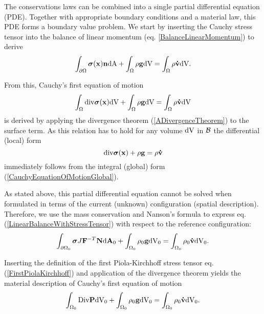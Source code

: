 The conservations laws can be combined into a single partial differential equation (PDE). Together with appropriate boundary conditions and a material law, this PDE forms a boundary value problem. We start by inserting the Cauchy stress tensor into the balance of linear momentum (eq. \ref{BalanceLinearMomentum}) to derive
 \begin{equation}
\int_{\partial \Omega}  \boldsymbol{\sigma} (\mathbf {x} )  \mathbf {n}   \textnormal{dA} + \int_{\Omega}   \rho \mathbf {g}   \textnormal{dV}  = \int _{\Omega} \rho \mathbf {\dot v}   \textnormal{dV}. 
\label{LinearBalanceWithStressTensor}
\end{equation}

From this, Cauchy's first equation of motion 
 \begin{equation}
\int_{ \Omega}   \textnormal{div} \boldsymbol{\sigma} (\mathbf {x} )   \textnormal{dV}  + \int_{\Omega}   \rho \mathbf {g}   \textnormal{dV}  = \int _{\Omega} \rho \mathbf {\dot v}   \textnormal{dV} 
\label{CauchyEquationOfMotionGlobal}
\end{equation}
is derived by applying the divergence theorem (\ref{ADivergenceTheorem}) to the surface term. As this relation has to hold for any volume $ \textnormal{dV}$ in $\mathcal{B} $ the differential (local) form
 \begin{equation}
  \textnormal{div} \boldsymbol{\sigma} (\mathbf {x} )    +    \rho \mathbf {g}    =  \rho \mathbf {\dot v}  
\label{CauchyEquationOfMotionLocal}
\end{equation}
immediately follows from the integral (global) form (\ref{CauchyEquationOfMotionGlobal}).

As stated above, this partial differential equation cannot be solved when formulated in terms of the current (unknown) configuration (spatial description). Therefore, we use the mass conservation and Nanson's formula to express eq. (\ref{LinearBalanceWithStressTensor}) with respect to the reference configuration: 
 \begin{equation}
\int_{\partial \Omega_0}  \boldsymbol{\sigma} J \mathbf {F }^{-T} \mathbf {N}   \textnormal{d}\mathbf{A}_0 + \int_{\Omega _0}   \rho _0 \mathbf {g}   \textnormal{dV}_0  = \int _{\Omega_0} \rho _0 \mathbf {\dot v}   \textnormal{dV}_0. 
\label{LinearBalanceWithStressTensorMaterial}
\end{equation}

Inserting the definition of the first Piola-Kirchhoff stress tensor eq. (\ref{FirstPiolaKirchhoff}) and application of the divergence theorem yields the material description of Cauchy's first equation of motion 
 \begin{equation}
\int_{\Omega_0}   \textnormal{Div}  \mathbf {P}    \textnormal{dV}_0 + \int_{\Omega _0}   \rho _0 \mathbf {g}   \textnormal{dV}_0  = \int _{\Omega_0} \rho _0 \mathbf {\dot v}   \textnormal{dV}_0. 
\label{MaterialEquationOfMotion}
\end{equation}

